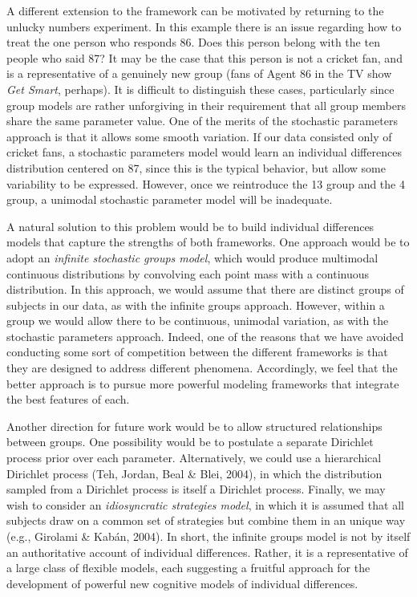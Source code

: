 \documentclass[authoryear]{elsarticle}
\begin{document}
A  different extension to the framework can be motivated by returning to
the unlucky numbers experiment. In this example
 there is an issue regarding how to treat the one person who
responds 86. Does this person belong with the ten people who said 87?
It may be the case that this person is not a cricket fan, and is a representative
of a genuinely new group (fans of Agent 86 in the TV show {\it Get Smart},
perhaps). It is difficult to distinguish these cases, particularly since
group models are rather unforgiving in their requirement that all group members
share the same parameter value. One of the merits of the stochastic
parameters approach is that it allows some smooth variation. If our data consisted
only of cricket fans, a stochastic parameters model would  learn an individual
differences distribution centered on 87, since this is the typical behavior, but
allow some variability to be expressed.
However, once we reintroduce the  13 group and the 4 group, a unimodal stochastic
parameter model will be inadequate.

A natural solution to this problem would be to build individual differences models
that capture the strengths of both frameworks. One approach would be to adopt
an {\it infinite stochastic groups model}, which would produce multimodal continuous
distributions by convolving each point mass with a  continuous distribution.  In this
approach, we would assume that there are distinct groups
of subjects in our data, as with the infinite groups approach. However, within a group we
would allow there to be continuous, unimodal
variation, as with the stochastic parameters approach. Indeed,
one of the reasons that we have avoided conducting some sort of competition
between the different frameworks is that they are designed to address different
phenomena. Accordingly, we feel that the better approach is to pursue more powerful
modeling frameworks that integrate the best features of each.

Another direction for future work would be to allow structured relationships
between groups. One possibility would be to postulate a separate Dirichlet process
prior over each parameter. Alternatively, we could use a hierarchical Dirichlet process
(Teh,  Jordan, Beal \& Blei, 2004), in which the distribution sampled from a Dirichlet process is itself
a Dirichlet process. Finally, we may wish to consider an {\it idiosyncratic strategies model},
in which it is assumed that all subjects draw on a common set of strategies
 but combine them in an unique way (e.g., Girolami \& Kab\'{a}n, 2004). In short,
the infinite groups model is not by itself an authoritative account of individual differences.
Rather, it is a representative of a large class of flexible models, each suggesting a fruitful
approach for the development of powerful new cognitive models of individual differences.
\end{document}
